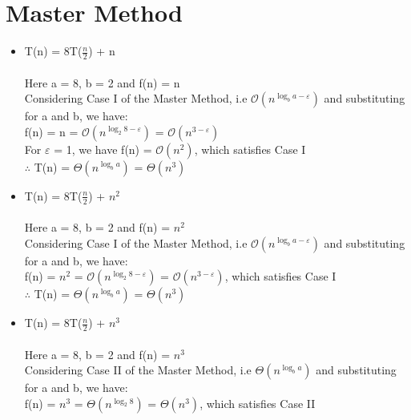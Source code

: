 \documentclass{article}
\begin{document}
\section{Master Method}

\begin{itemize}
\item T(n) = 8T($\frac{n}{2}$) + n \\ \\
  Here a = 8, b = 2 and f(n) = n \\
  Considering Case I of the Master Method, i.e $\mathcal{O}(n^{\log_b {a} - \varepsilon})$ and substituting for a and b, we have: \\

  f(n) = n = $\mathcal{O}(n^{\log_2 {8} - \varepsilon})$ =  $\mathcal{O}(n^{3 - \varepsilon})$ \\

  For $\varepsilon$ = 1, we have f(n) = $\mathcal{O}(n^{2})$, which satisfies Case I \\

  $\therefore$ T(n) = $\Theta(n^{\log_b {a}})$ = $\Theta(n^{3})$




\item T(n) = 8T($\frac{n}{2}$) + $n^{2}$ \\ \\
  Here a = 8, b = 2 and f(n) = $n^{2}$ \\
  Considering Case I of the Master Method, i.e $\mathcal{O}(n^{\log_b {a} - \varepsilon})$ and substituting for a and b, we have: \\

  f(n) = $n^{2}$ = $\mathcal{O}(n^{\log_2 {8} - \varepsilon})$ =  $\mathcal{O}(n^{3 - \varepsilon})$, which satisfies Case I \\

  $\therefore$ T(n) = $\Theta(n^{\log_b {a}})$ = $\Theta(n^{3})$




\item T(n) = 8T($\frac{n}{2}$) + $n^{3}$ \\ \\
  Here a = 8, b = 2 and f(n) = $n^{3}$ \\
  Considering Case II of the Master Method, i.e $\Theta(n^{\log_b {a}})$ and substituting for a and b, we have: \\

  f(n) = $n^{3}$ = $\Theta(n^{\log_2 {8}})$ =  $\Theta(n^{3})$, which satisfies Case II \\


\end{itemize}
\end{document}
